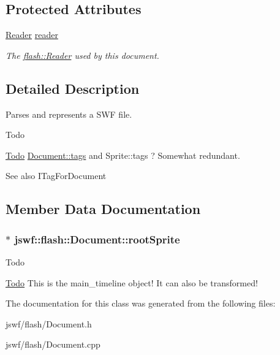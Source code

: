 \subsection*{Protected Attributes}
\begin{DoxyCompactItemize}
\item 
\hypertarget{classjswf_1_1flash_1_1_document_abc03a4a547e56b1117423589edad89e4}{\hyperlink{classjswf_1_1flash_1_1_reader}{Reader} \hyperlink{classjswf_1_1flash_1_1_document_abc03a4a547e56b1117423589edad89e4}{reader}}\label{classjswf_1_1flash_1_1_document_abc03a4a547e56b1117423589edad89e4}

\begin{DoxyCompactList}\small\item\em The \hyperlink{classjswf_1_1flash_1_1_reader}{flash\+::\+Reader} used by this document. \end{DoxyCompactList}\end{DoxyCompactItemize}


\subsection{Detailed Description}
Parses and represents a {\ttfamily S\+W\+F file}. 

\begin{DoxyRefDesc}{Todo}
\item[\hyperlink{todo__todo000009}{Todo}]\hyperlink{classjswf_1_1flash_1_1_document_ac2c8471be7e7cde4660b4183c0f29bba}{Document\+::tags} and Sprite\+::tags ? Somewhat redundant. \begin{DoxySeeAlso}{See also}
I\+Tag\+For\+Document 
\end{DoxySeeAlso}
\end{DoxyRefDesc}


\subsection{Member Data Documentation}
\hypertarget{classjswf_1_1flash_1_1_document_a2b85a878280ace8647cb05fdfd79e22a}{
\subsubsection[{root\+Sprite}]{$\ast$ jswf\+::flash\+::\+Document\+::root\+Sprite}}\label{classjswf_1_1flash_1_1_document_a2b85a878280ace8647cb05fdfd79e22a}
\begin{DoxyRefDesc}{Todo}
\item[\hyperlink{todo__todo000010}{Todo}]This is the main\+\_\+timeline object! It can also be transformed! \end{DoxyRefDesc}


The documentation for this class was generated from the following files\+:\begin{DoxyCompactItemize}
\item 
jswf/flash/Document.\+h\item 
jswf/flash/Document.\+cpp\end{DoxyCompactItemize}
